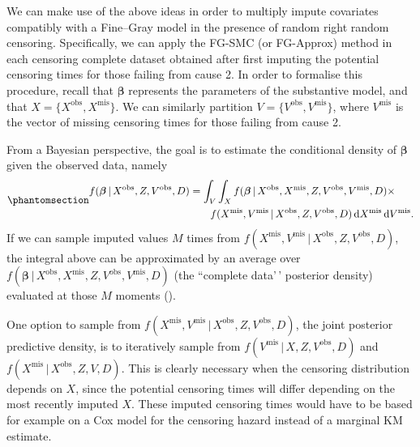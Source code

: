 \documentclass[
  letterpaper,
  DIV=11,
  numbers=noendperiod]{scrreprt}
\newcommand{\given}{\,|\,}
\newcommand\diff{\mathop{}\!\mathrm{d}}
\begin{document}
We can make use of the above ideas in order to multiply impute
covariates compatibly with a Fine--Gray model in the presence of random
right random censoring. Specifically, we can apply the FG-SMC (or
FG-Approx) method in each censoring complete dataset obtained after
first imputing the potential censoring times for those failing from
cause 2. In order to formalise this procedure, recall that
\(\boldsymbol{\beta}\) represents the parameters of the substantive
model, and that \(X = \{X^{\text{obs}},X^{\text{mis}}\}\). We can
similarly partition \(V = \{V^{\text{obs}},V^{\text{mis}}\}\), where
\(V^{\text{mis}}\) is the vector of missing censoring times for those
failing from cause 2.

From a Bayesian perspective, the goal is to estimate the conditional
density of \(\boldsymbol{\beta}\) given the observed data, namely
\begin{equation}\phantomsection\label{eq-posterior-beta}{
\begin{aligned}
    f(\boldsymbol{\beta} \given X^{\text{obs}},Z,V^{\text{obs}},D) &= \int_V \int_X f(\boldsymbol{\beta} \given X^{\text{obs}},X^{\text{mis}},Z,V^{\text{obs}},V^{\text{mis}},D) \times  \\ 
    &\qquad f(X^{\text{mis}}, V^{\text{mis}} \given X^{\text{obs}},Z,V^{\text{obs}},D)\diff X^{\text{mis}}\diff V^{\text{mis}}. 
\end{aligned} 
}\end{equation} If we can sample imputed values \(M\) times from
\(f(X^{\text{mis}}, V^{\text{mis}} \given X^{\text{obs}},Z,V^{\text{obs}},D)\),
the integral above can be approximated by an average over
\(f(\boldsymbol{\beta} \given X^{\text{obs}},X^{\text{mis}},Z,V^{\text{obs}},V^{\text{mis}},D)\)
(the ``complete data'\,' posterior density) evaluated at those \(M\)
moments ().

One option to sample from
\(f(X^{\text{mis}}, V^{\text{mis}} \given X^{\text{obs}},Z,V^{\text{obs}},D)\),
the joint posterior predictive density, is to iteratively sample from
\(f(V^{\text{mis}} \given X,Z,V^{\text{obs}},D)\) and
\(f(X^{\text{mis}} \given X^{\text{obs}},Z,V,D)\). This is clearly
necessary when the censoring distribution depends on \(X\), since the
potential censoring times will differ depending on the most recently
imputed \(X\). These imputed censoring times would have to be based for
example on a Cox model for the censoring hazard instead of a marginal KM
estimate.
\end{document}
